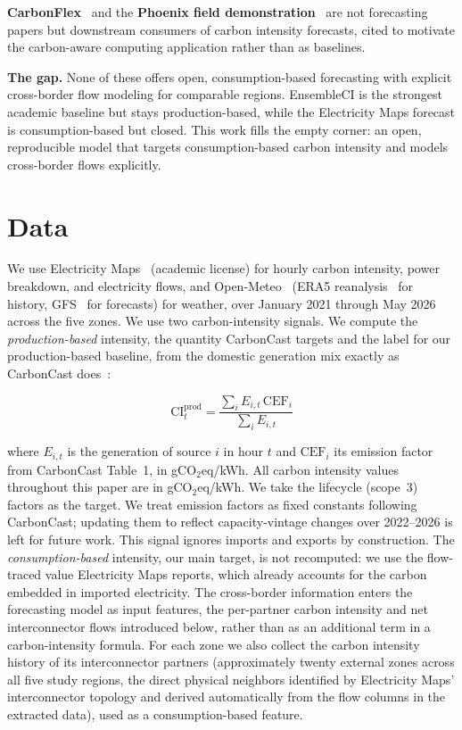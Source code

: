 \documentclass[sigconf,nonacm,a4paper]{acmart}  %
\begin{document}
\textbf{CarbonFlex}~\cite{hanafy2025carbonflex} and the \textbf{Phoenix field
demonstration}~\cite{colangelo2025phoenix} are not forecasting papers but
downstream consumers of carbon intensity forecasts, cited to motivate the
carbon-aware computing application rather than as baselines.

\textbf{The gap.} None of these offers open, consumption-based forecasting with
explicit cross-border flow modeling for comparable regions. EnsembleCI is the
strongest academic baseline but stays production-based, while the Electricity Maps forecast
is consumption-based but closed. This work fills the empty corner: an open,
reproducible model that targets consumption-based carbon intensity and models
cross-border flows explicitly.

\section{Data}

We use Electricity Maps~\cite{electricitymaps2025forecast} (academic license) for hourly carbon intensity, power breakdown, and electricity flows, and Open-Meteo~\cite{openmeteo} (ERA5 reanalysis~\cite{hersbach2020era5} for history,
GFS~\cite{noaagfs} for forecasts) for weather, over January 2021 through May 2026 across the five zones. We use two carbon-intensity signals. We compute the \emph{production-based} intensity, the quantity CarbonCast targets and the label for our production-based baseline, from the domestic generation mix exactly as CarbonCast does~\cite{maji2022carboncast}:

\begin{equation}
\mathrm{CI}^{\mathrm{prod}}_t = \frac{\sum_i E_{i,t}\,\mathrm{CEF}_i}{\sum_i E_{i,t}}
\end{equation}
\vspace{0.5em}

where $E_{i,t}$ is the generation of source $i$ in hour $t$ and $\mathrm{CEF}_i$ its
emission factor from CarbonCast Table~1, in gCO$_2$eq/kWh. All carbon intensity
values throughout this paper are in gCO$_2$eq/kWh. We take the lifecycle (scope~3) factors as the target. We treat
emission factors as fixed constants following CarbonCast; updating them to reflect
capacity-vintage changes over 2022--2026 is left for future work. This signal
ignores imports and exports by construction. The \emph{consumption-based} intensity,
our main target, is not recomputed: we use the flow-traced value Electricity Maps
reports, which already accounts for the carbon embedded in imported electricity. The
cross-border information enters the forecasting model as input features, the
per-partner carbon intensity and net interconnector flows introduced below, rather
than as an additional term in a carbon-intensity formula. For each zone we also
collect the carbon intensity history of its interconnector partners (approximately twenty
external zones across all five study regions, the direct physical neighbors identified
by Electricity Maps' interconnector topology and derived automatically from the flow
columns in the extracted data),
used as a consumption-based feature.
\end{document}

